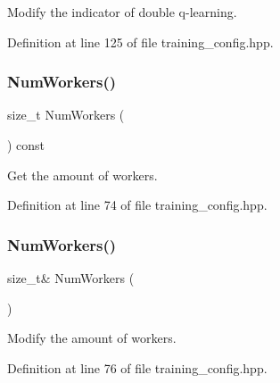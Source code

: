 Modify the indicator of double q-\/learning. 



Definition at line 125 of file training\+\_\+config.\+hpp.

\mbox{\label{classmlpack_1_1rl_1_1TrainingConfig_a924fc92508c8bd78b50b0859e039b4f6}} 
\subsubsection{Num\+Workers()\hspace{0.1cm}{\footnotesize\ttfamily [1/2]}}
{\footnotesize\ttfamily size\+\_\+t Num\+Workers (\begin{DoxyParamCaption}{ }\end{DoxyParamCaption}) const\hspace{0.3cm}{\ttfamily [inline]}}



Get the amount of workers. 



Definition at line 74 of file training\+\_\+config.\+hpp.

\mbox{\label{classmlpack_1_1rl_1_1TrainingConfig_a0c9a438aa9ae517c2c0d79a1d9c91143}} 
\subsubsection{Num\+Workers()\hspace{0.1cm}{\footnotesize\ttfamily [2/2]}}
{\footnotesize\ttfamily size\+\_\+t\& Num\+Workers (\begin{DoxyParamCaption}{ }\end{DoxyParamCaption})\hspace{0.3cm}{\ttfamily [inline]}}



Modify the amount of workers. 



Definition at line 76 of file training\+\_\+config.\+hpp.

\mbox{\label{classmlpack_1_1rl_1_1TrainingConfig_a309719b378c0bb1962982a8162e58e84}} 
